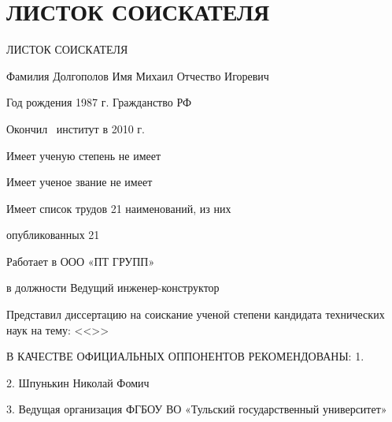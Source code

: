 

\section{ЛИСТОК СОИСКАТЕЛЯ}

ЛИСТОК СОИСКАТЕЛЯ

Фамилия	Долгополов	Имя	Михаил	Отчество	Игоревич

Год рождения	1987 г.		Гражданство	РФ

Окончил	\thesisOrganizationShort\	институт в	2010 г.

Имеет ученую степень	не имеет

Имеет ученое звание	не имеет

Имеет список трудов	21	наименований, из них

опубликованных	21		

Работает в	ООО «ПТ ГРУПП»

в должности	Ведущий инженер-конструктор

Представил диссертацию на соискание ученой степени кандидата технических наук на тему: <<\thesisTitle>>

В КАЧЕСТВЕ ОФИЦИАЛЬНЫХ ОППОНЕНТОВ РЕКОМЕНДОВАНЫ:
1. \opponentOneRegalia\	\opponentOneFio

2. \opponentTwoRegalia	Шпунькин Николай Фомич

3.	Ведущая организация	ФГБОУ ВО «Тульский государственный 
университет»

\clearpage